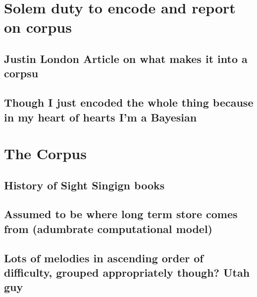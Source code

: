 \documentclass[]{book}
\theoremstyle{definition}
\theoremstyle{definition}
\theoremstyle{definition}
\theoremstyle{remark}
\begin{document}
\hypertarget{solem-duty-to-encode-and-report-on-corpus}{%
\section{Solem duty to encode and report on
corpus}\label{solem-duty-to-encode-and-report-on-corpus}}

\hypertarget{justin-london-article-on-what-makes-it-into-a-corpsu}{%
\subsection{Justin London Article on what makes it into a
corpsu}\label{justin-london-article-on-what-makes-it-into-a-corpsu}}

\hypertarget{though-i-just-encoded-the-whole-thing-because-in-my-heart-of-hearts-im-a-bayesian}{%
\subsection{Though I just encoded the whole thing because in my heart of
hearts I'm a
Bayesian}\label{though-i-just-encoded-the-whole-thing-because-in-my-heart-of-hearts-im-a-bayesian}}

\hypertarget{the-corpus}{%
\section{The Corpus}\label{the-corpus}}

\hypertarget{history-of-sight-singign-books}{%
\subsection{History of Sight Singign
books}\label{history-of-sight-singign-books}}

\hypertarget{assumed-to-be-where-long-term-store-comes-from-adumbrate-computational-model}{%
\subsection{Assumed to be where long term store comes from (adumbrate
computational
model)}\label{assumed-to-be-where-long-term-store-comes-from-adumbrate-computational-model}}

\hypertarget{lots-of-melodies-in-ascending-order-of-difficulty-grouped-appropriately-though-utah-guy}{%
\subsection{Lots of melodies in ascending order of difficulty, grouped
appropriately though? Utah
guy}\label{lots-of-melodies-in-ascending-order-of-difficulty-grouped-appropriately-though-utah-guy}}
\end{document}

